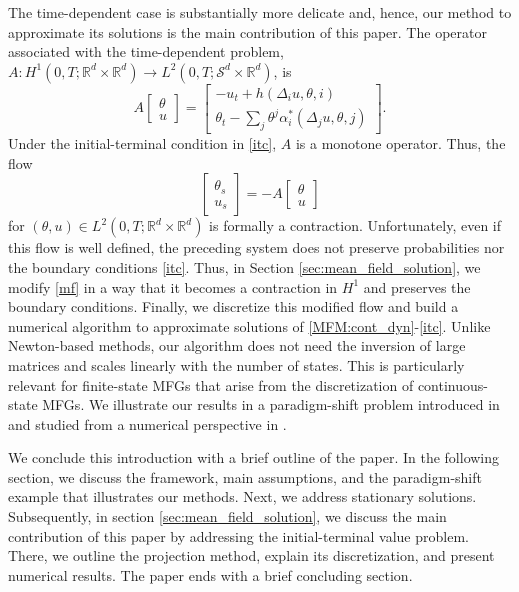 \documentclass[12pt]{amsart}
\newcommand{\Rr}{{\mathbb{R}}}
\newcommand{\1}{{\chi}}
\newcommand{\Ss}{\mathcal{S}}
\theoremstyle{definition}
\begin{document}
The time-dependent case is substantially more delicate and, hence, our method
to approximate its solutions is  
the main contribution of this paper.
The operator associated with the time-dependent problem, 
$A:H^1(0,T; \Rr^d\times \Rr^d)\to  L^2(0,T; \Ss^d\times \Rr^d)$, is
\begin{equation}
\label{opb}
A\left[
\begin{array}{c}
\theta\\
u
\end{array}\right]
=
\left[
\begin{array}{c}
-u_t+h(\Delta_i u,\theta,i)\\
\theta_t-\sum_{j} \theta^j \alpha^*_i(\Delta_j u,\theta,j) 
\end{array}
\right].                        
\end{equation} 
Under the initial-terminal condition in \eqref{itc}, $A$ is a monotone operator. Thus, the  flow 
\begin{equation}
\label{mf}
\left[
\begin{array}{c}
\theta_s\\
u_s
\end{array}\right]
=-A\left[
\begin{array}{c}
\theta\\
u
\end{array}\right]  
\end{equation}
for  $(\theta, u)\in L^2(0,T; \Rr^d\times \Rr^d)$
is formally a contraction. 
 Unfortunately, even if this flow is well defined, 
the preceding system does not preserve probabilities nor the boundary conditions \eqref{itc}. Thus, 
in Section \ref{sec:mean_field_solution}, we modify \eqref{mf} in a way that it becomes a contraction in $H^1$ and preserves the boundary
conditions. 
Finally, we discretize this modified flow and build a numerical
algorithm to approximate solutions of \eqref{MFM:cont_dyn}-\eqref{itc}. 
Unlike Newton-based methods, our algorithm does not need the inversion
of large matrices and scales linearly with the number of states. This is
particularly relevant for finite-state MFGs that arise from the 
discretization of continuous-state MFGs. 
We illustrate our results in a paradigm-shift problem introduced in \cite{BesancenotDogguy} and
studied from a numerical perspective in \cite{Gomes:2014kq}.

We conclude this introduction with a brief outline of the paper. 
In the following section, we discuss the framework, main assumptions, 
and the paradigm-shift example that illustrates our methods. 
Next, we address stationary solutions. Subsequently, in section 
\ref{sec:mean_field_solution}, we discuss the main contribution of this paper by addressing the initial-terminal value problem. There, 
we outline the projection method, explain its discretization, and 
present numerical results. The paper ends with a brief concluding section. 
\end{document}

